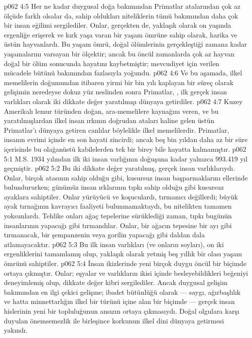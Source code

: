 \vs p062 4:5 Her ne kadar duygusal doğa bakımından Primatlar atalarından çok az ölçüde farklı olsalar da, sahip oldukları niteliklerin tümü bakımından daha çok bir insan eğilimi sergilediler. Onlar, gerçekten de, yaklaşık olarak on yaşında ergenliğe erişerek ve kırk yaşa varan bir yaşam ömrüne sahip olarak, harika ve üstün hayvanlardı. Bu yaşam ömrü, doğal ölümlerinin gerçekleştiği zamana kadar yaşamalarını varsayan bir ölçektir; ancak bu öncül zamanlarda çok az hayvan doğal bir ölüm sonucunda hayatını kaybetmiştir; mevcudiyet için verilen mücadele bütünü bakımından fazlasıyla yoğundu.
\vs p062 4:6 Ve bu aşamada, ilkel memelilerin doğumundan itibaren yirmi bir bin yılı kaplayan bir süreç olarak gelişimin neredeyse dokuz yüz neslinden sonra Primatlar, , ilk gerçek insan varlıkları olarak iki dikkate değer yaratılmışı dünyaya getirdiler.
\vs p062 4:7 Kuzey Amerikalı lemur türünden doğan, ara\hyp{}memelilere kaynağını veren, ve bu yaratılmışlardan ilkel insan ırkının doğrudan ataları haline gelen üstün Primatlar’ı dünyaya getiren canlılar böylelikle ilkel memelilerdir. Primatlar, insanın evrimi içinde en son hayati zincirdi; ancak beş bin yıldan daha az bir süre içerisinde bu olağanüstü kabilelerden tek bir birey bile hayatta kalmamıştır.
\vs p062 5:1 M.S. 1934 yılından ilk iki insan varlığının doğuşuna kadar yalnızca 993.419 yıl geçmiştir.
\vs p062 5:2 Bu iki dikkate değer yaratılmış, gerçek insan varlıklarıydı. Onlar, birçok atasının sahip olduğu gibi, kusursuz insan başparmaklarını ellerinde bulundururken; günümüz insan ırklarının tıpkı sahip olduğu gibi kusursuz ayaklara sahiptiler. Onlar yürüyücü ve koşuculardı, tırmanıcı değillerdi; büyük ayak tırnağının kavrayıcı faaliyeti bulunmamaktaydı, bu nitelikten tamamen yoksunlardı. Tehlike onları ağaç tepelerine sürüklediği zaman, tıpkı bugünün insanlarının yapacağı gibi tırmandılar. Onlar, bir ağacın tepesine bir ayı gibi tırmanacak, bir şempanzenin veya gorilin yapacağı gibi daldan dala atlamayacaktır.
\vs p062 5:3 Bu ilk insan varlıkları (ve onların soyları), on iki ergenliklerini tamamlamış olup, yaklaşık olarak yetmiş beş yıllık bir olası yaşam ömrünü sahiptiler.
\vs p062 5:4 İnsan ikizlerinde yeni birçok duygu öncül bir biçimde ortaya çıkmıştır. Onlar; eşyalar ve varlıkların ikisi içinde besleyebildikleri beğeniyi deneyimlemiş olup, dikkate değer kibri sergilediler. Ancak duygusal gelişim bakımından en ilgi çekici gelişme; ibadet bütünlüğü olarak --- saygı, ağırbaşlılık ve hatta minnettarlığın ilkel bir türünü içine alan bir biçimde --- gerçek insan hislerinin yeni bir topluluğunun ansızın ortaya çıkmasıydı. Doğal olgulara karşı duyulan önemsemezlik ile birleşince korkunun ilkel dini dünyaya getirmesi yakındı.
